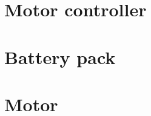 \documentclass[../SimBALink.tex]{subfiles}
\begin{document}
\section{Motor controller}


\section{Battery pack}



\section{Motor}


\end{document}
